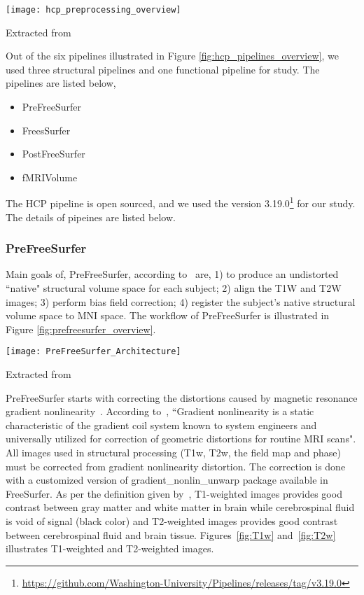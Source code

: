 \begin{center}
   \texttt{[image: hcp\_preprocessing\_overview]}
   \label{fig:hcp_pipelines_overview}
   \caption*{Extracted from \cite{Gla13}}
\end{center}

Out of the six pipelines illustrated in Figure \ref{fig:hcp_pipelines_overview}, we used three structural pipelines and one functional pipeline for study. The pipelines are listed below, 
\begin{itemize}
  \item PreFreeSurfer
  \item FreesSurfer
  \item PostFreeSurfer
  \item fMRIVolume
\end{itemize}

The HCP pipeline is open sourced, and we used the version 3.19.0\footnote{\url{https://github.com/Washington-University/Pipelines/releases/tag/v3.19.0}} for our study. The details of pipeines are listed below. 

\subsubsection{PreFreeSurfer}
Main goals of, PreFreeSurfer, according to~\cite{Gla13} are, 1) to produce an undistorted ``native" structural volume space for each subject; 2) align the T1W and T2W images; 3) perform bias field correction; 4) register the subject's native structural volume space to MNI space. The workflow of PreFreeSurfer is illustrated in Figure \ref{fig:prefreesurfer_overview}.

\begin{center}
  \texttt{[image: PreFreeSurfer\_Architecture]}
  \label{fig:prefreesurfer_overview}
  \caption*{Extracted from \cite{Gla13}}
\end{center}

PreFreeSurfer starts with correcting the distortions caused by magnetic resonance gradient nonlinearity~\cite{Gla13}. According to~\cite{Zou2004}, ``Gradient nonlinearity is a static characteristic of the gradient coil system known to system engineers and universally utilized for correction of geometric distortions for routine MRI scans". All images used in structural processing (T1w, T2w, the field map and phase) must be corrected from gradient nonlinearity distortion. The correction is done with a customized version of gradient\_nonlin\_unwarp package available in FreeSurfer. As per the definition given by~\cite{t1w_t2w}, T1-weighted images provides good contrast between gray matter and white matter in brain while cerebrospinal fluid is void of signal (black color) and T2-weighted images provides good contrast between cerebrospinal fluid and brain tissue. Figures~\ref{fig:T1w} and~\ref{fig:T2w} illustrates T1-weighted and T2-weighted images.\\

